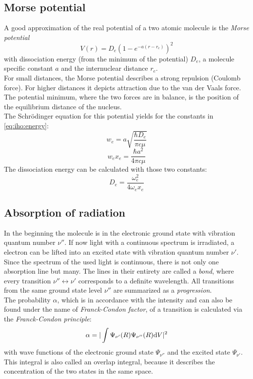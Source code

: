 \subsection{Morse potential}
A good approximation of the real potential of a two atomic molecule is the \emph{Morse potential}
\begin{equation}
\label{eq:morse}
  V(r) = D_e \left( 1 - e^{-a(r-r_e)} \right)^2
\end{equation}
with dissociation energy (from the minimum of the potential) $D_e$,
a molecule specific constant $a$  and the internuclear distance $r_e$. \\
For small distances, the Morse potential describes a strong repulsion (Coulomb force).
For higher distances it depicts attraction due to the van der Vaals force.
The potential minimum, where the two forces are in balance,
is the position of the equilibrium distance of the nucleus. \\
The Schrödinger equation for this potential yields for the constants in \autoref{eq:iho:energy}:
\begin{equation}
\label{eq:morse_we}
  w_e = a \sqrt{\frac{\hbar D_e}{\pi c \mu}}
\end{equation}
\begin{equation}
\label{eq:morse_wexe}
  w_e x_e = \frac{\hbar a^2}{4 \pi c \mu}
\end{equation}
The dissociation energy can be calculated with those two constants:
\begin{equation}
\label{eq:morse_dissenergy}
  D_e = \frac{\omega_e^2}{4 \omega_e x_e}
\end{equation}

\subsection{Absorption of radiation}
In the beginning the molecule is in the electronic ground state with vibration quantum number $\nu''$. If now light with a continuous spectrum is 
irradiated, a electron can be lifted into an excited state with vibration quantum number $\nu'$. Since the spectrum of the used light is continuous, there is not only one 
absorption line but many. The lines in their entirety are called a \emph{bond}, where every transition $\nu'' \leftrightarrow \nu'$ corresponds to 
a definite wavelength. All transitions from the same ground state level $\nu''$ are summarized as a \emph{progression}.\\
The probability $\alpha$, which is in accordance with the intensity and can also be found under the name of \emph{Franck-Condon factor}, 
of a transition is calculated via the \emph{Franck-Condon principle}:
\begin{equation}
  \alpha = | \int \Psi_{\nu'}(R) \Psi_{\nu''}(R) \mathrm{d} V |^2
\end{equation}
with wave functions of the electronic ground state $\Psi_{\nu''}$ and the excited state $\Psi_{\nu'}$.
This integral is also called an overlap integral, because it describes the concentration of the two states in the same space.


